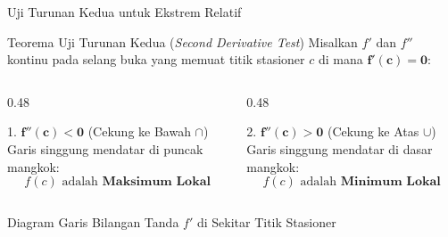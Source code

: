 \documentclass[aspectratio=169,10pt]{beamer}
\begin{document}
\begin{frame}{Uji Turunan Kedua untuk Ekstrem Relatif}
    \begin{block}{Teorema Uji Turunan Kedua (\textit{Second Derivative Test})}
        Misalkan $f'$ dan $f''$ kontinu pada selang buka yang memuat titik stasioner $c$ di mana $\mathbf{f'(c) = 0}$:
    \end{block}

    \vspace{0.05cm}
    \begin{columns}[T]
        \begin{column}{0.48\textwidth}
            \begin{alertblock}{1. $\mathbf{f''(c) < 0}$ (Cekung ke Bawah $\cap$)}
                Garis singgung mendatar di puncak mangkok:
                \[
                    f(c) \text{ adalah } \textbf{Maksimum Lokal}
                \]
            \end{alertblock}
        \end{column}

        \begin{column}{0.48\textwidth}
            \begin{exampleblock}{2. $\mathbf{f''(c) > 0}$ (Cekung ke Atas $\cup$)}
                Garis singgung mendatar di dasar mangkok:
                \[
                    f(c) \text{ adalah } \textbf{Minimum Lokal}
                \]
            \end{exampleblock}
        \end{column}
    \end{columns}

    \vspace{0.05cm}
    \begin{block}{Diagram Garis Bilangan Tanda $f'$ di Sekitar Titik Stasioner}
        \centering
\end{block}
\end{frame}
\end{document}
